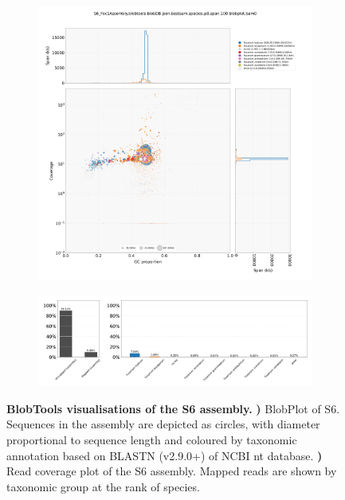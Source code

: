 \begin{figure}[hp!]
    \centering
    \begin{subfigure}[]{0.99\textwidth}
        \centering
        \includegraphics[width=\textwidth]{Appendices/S6_Foc1Assembly.blobtools.blobDB.json.bestsum.species.p8.span.100.blobplot.bam0.png}
        \caption{}
        \label{fig:BlobPlot-S6}
    \end{subfigure}
    \begin{subfigure}[]{0.9\textwidth}
        \centering
        \includegraphics[width=\textwidth]{Appendices/S6_Foc1Assembly.blobtools.blobDB.json.bestsum.species.p8.span.100.blobplot.read_cov.bam0.png}
        \caption{}
        \label{fig:BlobPlot_readcov-S6}
    \end{subfigure}
    \caption[BlobTools visualisations of the S6 assembly]{\textbf{BlobTools visualisations of the S6 assembly.}
        \textbf{) }BlobPlot of S6. Sequences in the assembly are depicted as circles, with diameter proportional to sequence length and coloured by taxonomic annotation based on BLASTN (v2.9.0+) of NCBI nt database.
        \textbf{)} Read coverage plot of the S6 assembly. Mapped reads are shown by taxonomic group at the rank of species.}
        \label{fig:S6:BlobTools}
\end{figure}

